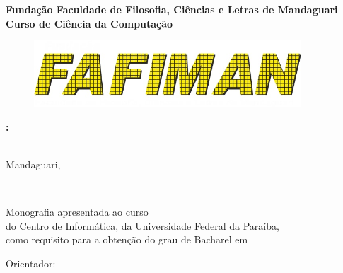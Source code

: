 \documentclass{tcc}
\begin{document}
\pagestyle{empty} %


\begin{center}
\LARGE{\bf
Fundação Faculdade de Filosofia, Ciências e Letras de Mandaguari
}\\
\Large{\bf
    Curso de Ciência da Computação
}
\end{center}
\begin{figure}[H]
\vspace*{3cm}
\centering
\includegraphics[width=100mm]{imagens/logo2.jpg}
\vspace*{3cm}
\end{figure}


\begin{center}
\LARGE{\bf \thetitle:}\\
\Large{\bf \subtitulo}\\
\end{center}

\vspace{1em}

\vfill

\vspace{2in}

\begin{center}
\bf\theauthor
\vspace*{2cm}
\end{center}

\begin{center}
Mandaguari, \the\year
\end{center}
\afterpage{\blankpage \addtocounter{page}{1}} %

\newpage
\begin{center}
\theauthor
\end{center}
\vspace{3in}
\begin{center}
\LARGE{\thetitle}\\
\end{center}

\vspace{2in}

\begin{flushright}
Monografia apresentada ao curso \nomedocurso \\ do Centro de Informática, da Universidade Federal da Paraíba, \\ como requisito para a obtenção do grau de Bacharel em \titulobar
\\
\vspace{0.2in}

Orientador: \orientador


\end{flushright}
\end{document}
